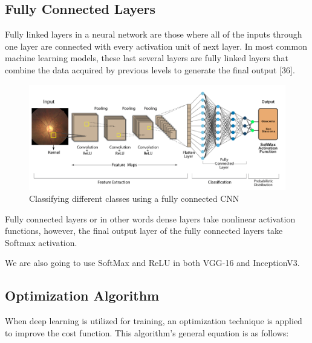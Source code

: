 \vspace{5mm}
\subsection{Fully Connected Layers}

\vspace{5mm}
Fully linked layers in a neural network are those where all of the inputs through one layer are connected with every activation unit of next layer. In most common machine learning models, these last several layers are fully linked layers that combine the data acquired by previous levels to generate the final output [36].

\vspace{5mm}
\begin{figure}[hbt!]
\centering
\includegraphics[scale=0.45]{images/Fully Connected CNN classifying between classes.png}
\caption{Classifying different classes using a fully connected CNN}
\label{fig:x Classifying different classes using a fully connected CNN}
\end{figure}

\noindent Fully connected layers or in other words dense layers take nonlinear activation functions, however, the final output layer of the fully connected layers take Softmax activation.

\vspace{5mm}
\noindent We are also going to use SoftMax and ReLU in both VGG-16 and InceptionV3.

\vspace{5mm}
\subsection{Optimization Algorithm}
\vspace{5mm}
\noindent When deep learning is utilized for training, an optimization technique is applied to improve the cost function. This algorithm's general equation is as follows:

